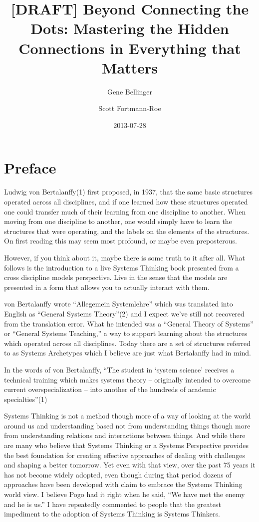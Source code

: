 \documentclass[]{memoir}
\title{{[}DRAFT{]} Beyond Connecting the Dots: Mastering the Hidden Connections
       in Everything that Matters}
\author{Gene Bellinger \and Scott Fortmann-Roe}
\date{2013-07-28}
\begin{document}
\maketitle

{
\hypersetup{linkcolor=black}
\setcounter{tocdepth}{1}
\tableofcontents
}
\section{Preface}

Ludwig von Bertalanffy(1) first proposed, in 1937, that the same basic
structures operated across all disciplines, and if one learned how these
structures operated one could transfer much of their learning from one
discipline to another. When moving from one discipline to another, one
would simply have to learn the structures that were operating, and the
labels on the elements of the structures. On first reading this may seem
most profound, or maybe even preposterous.

However, if you think about it, maybe there is some truth to it after
all. What follows is the introduction to a live Systems Thinking book
presented from a cross discipline models perspective. Live in the sense
that the models are presented in a form that allows you to actually
interact with them.

von Bertalanffy wrote ``Allegemein Systemlehre'' which was translated
into English as ``General Systems Theory''(2) and I expect we've still
not recovered from the translation error. What he intended was a
``General Theory of Systems'' or ``General Systems Teaching,'' a way to
support learning about the structures which operated across all
disciplines. Today there are a set of structures referred to as Systems
Archetypes which I believe are just what Bertalanffy had in mind.

In the words of von Bertalanffy, ``The student in `system science'
receives a technical training which makes systems theory -- originally
intended to overcome current overspecialization -- into another of the
hundreds of academic specialties''(1)

Systems Thinking is not a method though more of a way of looking at the
world around us and understanding based not from understanding things
though more from understanding relations and interactions between
things. And while there are many who believe that Systems Thinking or a
Systems Perspective provides the best foundation for creating effective
approaches of dealing with challenges and shaping a better tomorrow. Yet
even with that view, over the past 75 years it has not become widely
adopted, even though during that period dozens of approaches have been
developed with claim to embrace the Systems Thinking world view. I
believe Pogo had it right when he said, ``We have met the enemy and he
is us.'' I have repeatedly commented to people that the greatest
impediment to the adoption of Systems Thinking is Systems Thinkers.
\end{document}
